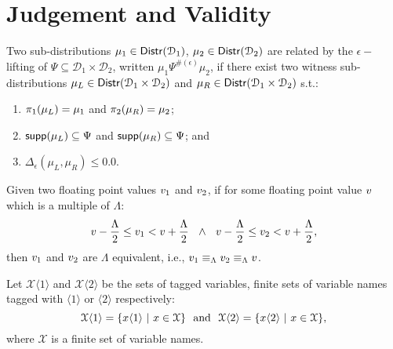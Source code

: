 \documentclass[a4paper,11pt]{article}
\begin{document}
\section{Judgement and Validity}
%
\begin{defn}
Two sub-distributions $\mu_1 \in \mathsf{Distr}(\mathcal{D}_1)$, $\mu_2 \in \mathsf{Distr}(\mathcal{D}_2)$ are related by the $\epsilon-$lifting of $\Psi \subseteq \mathcal{D}_1 \times \mathcal{D}_2$, written $\mu_1 \Psi^{\#(\epsilon)} \mu_2$, if there exist two witness sub-distributions $\mu_L \in \mathsf{Distr}(\mathcal{D}_1 \times \mathcal{D}_2)$ and $\mu_R \in \mathsf{Distr}(\mathcal{D}_1 \times \mathcal{D}_2)$ s.t.:
\begin{enumerate}
	\item $\pi_1(\mu_L) = \mu_1$ and $\pi_2(\mu_R) = \mu_2$;
	\item $\mathsf{supp}(\mu_L) \subseteq \Psi$ and $\mathsf{supp}(\mu_R) \subseteq \Psi$; and
	\item $\Delta_{\epsilon}(\mu_L, \mu_R) \leq 0.0$.
\end{enumerate}
\end{defn}
%
%
\begin{defn}
Given two floating point values $v_1$ and $v_2$, if for some floating point value $v$ which is a multiple of $\Lambda$:
\[
	v - \frac{\Lambda}{2} \leq v_1 < v + \frac{\Lambda}{2}
	~~
	\land
	~~
	v - \frac{\Lambda}{2} \leq v_2 < v + \frac{\Lambda}{2},	
\]
then $v_1$ and $v_2$ are $\Lambda$ equivalent, i.e., 
$v_1 \equiv_{\Lambda} v_2 \equiv_{\Lambda} v$.
\end{defn}
%
%
\begin{defn}
Let $\mathcal{X}\langle 1 \rangle$ and $\mathcal{X}\langle 2 \rangle$ be the sets of tagged variables, finite sets of variable names tagged with $\langle 1 \rangle$ or $\langle 2 \rangle$ respectively:
\[
	\mathcal{X}\langle 1 \rangle = \{x\langle 1 \rangle ~|~ x \in \mathcal{X}\}
	~~
	\text{and}
	~~
	\mathcal{X}\langle 2 \rangle = \{x\langle 2 \rangle ~|~ x \in \mathcal{X}\},
\]
where $\mathcal{X}$ is a finite set of variable names.
\end{defn}
%
\end{document}
